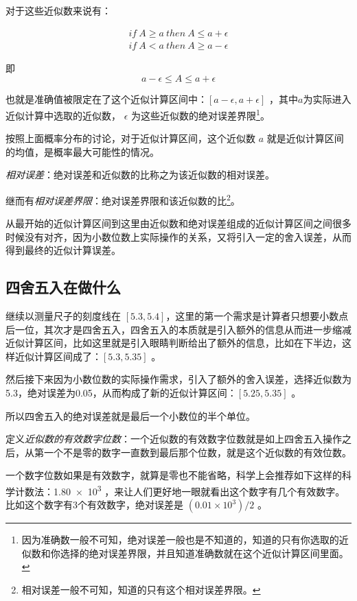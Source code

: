 \documentclass[12pt,oneside]{book}
\begin{document}
对于这些近似数来说有：

\begin{align*}
if \ A \geqslant a \ then \ A \leqslant a + \epsilon  \\
if \ A < a \ then \ A \geqslant a - \epsilon
\end{align*}

即
\begin{equation}
a - \epsilon \leqslant A \leqslant a + \epsilon
\end{equation}

也就是准确值被限定在了这个近似计算区间中：$ [a-\epsilon, a+\epsilon] $ ，其中$ a $为实际进入近似计算中选取的近似数， $ \epsilon $ 为这些近似数的绝对误差界限\footnote{因为准确数一般不可知，绝对误差一般也是不知道的，知道的只有你选取的近似数和你选择的绝对误差界限，并且知道准确数就在这个近似计算区间里面。}。

按照上面概率分布的讨论，对于近似计算区间，这个近似数 $ a $ 就是近似计算区间的均值，是概率最大可能性的情况。

\emph{相对误差}：绝对误差和近似数的比称之为该近似数的相对误差。

继而有\emph{相对误差界限}：绝对误差界限和该近似数的比\footnote{相对误差一般不可知，知道的只有这个相对误差界限。}。

从最开始的近似计算区间到这里由近似数和绝对误差组成的近似计算区间之间很多时候没有对齐，因为小数位数上实际操作的关系，又将引入一定的舍入误差，从而得到最终的近似计算误差。

\subsection{四舍五入在做什么}
继续以测量尺子的刻度线在 $[5.3, 5.4]$，这里的第一个需求是计算者只想要小数点后一位，其次才是四舍五入，四舍五入的本质就是引入额外的信息从而进一步缩减近似计算区间，比如这里就是引入眼睛判断给出了额外的信息，比如在下半边，这样近似计算区间成了：$[5.3, 5.35]$ 。

然后接下来因为小数位数的实际操作需求，引入了额外的舍入误差，选择近似数为5.3，绝对误差为0.05，从而构成了新的近似计算区间：$ [5.25, 5.35] $ 。

所以四舍五入的绝对误差就是最后一个小数位的半个单位。

定义\emph{近似数的有效数字位数}：一个近似数的有效数字位数就是如上四舍五入操作之后，从第一个不是零的数字一直数到最后那个位数，就是这个近似数的有效位数。

一个数字位数如果是有效数字，就算是零也不能省略，科学上会推荐如下这样的科学计数法：\num{1.80e3} ，来让人们更好地一眼就看出这个数字有几个有效数字。比如这个数字有3个有效数字，绝对误差是 $ (0.01 \times 10^{3}) /2 $ 。
\end{document}
